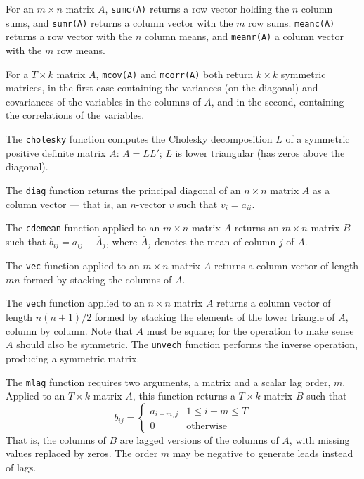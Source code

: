 For an $m \times n$ matrix $A$, \texttt{sumc(A)} returns a row vector
holding the $n$ column sums, and \texttt{sumr(A)} returns a column
vector with the $m$ row sums.  \texttt{meanc(A)} returns a row vector
with the $n$ column means, and \texttt{meanr(A)} a column vector with
the $m$ row means.

For a $T \times k$ matrix $A$, \texttt{mcov(A)} and \texttt{mcorr(A)}
both return $k \times k$ symmetric matrices, in the first case
containing the variances (on the diagonal) and covariances of the
variables in the columns of $A$, and in the second, containing the
correlations of the variables.

The \texttt{cholesky} function computes the Cholesky decomposition $L$
of a symmetric positive definite matrix $A$: $A = LL'$; $L$ is lower
triangular (has zeros above the diagonal).  

The \texttt{diag} function returns the principal diagonal of an
$n\times n$ matrix $A$ as a column vector --- that is, an
$n$-vector $v$ such that $v_i = a_{ii}$.

The \texttt{cdemean} function applied to an $m \times n$ matrix $A$
returns an $m \times n$ matrix $B$ such that $b_{ij} = a_{ij} -
\bar{A}_j$, where $\bar{A}_j$ denotes the mean of column $j$ of $A$.  

The \texttt{vec} function applied to an $m \times n$ matrix $A$
returns a column vector of length $mn$ formed by stacking the columns
of $A$.  

The \texttt{vech} function applied to an $n \times n$ matrix $A$
returns a column vector of length $n(n+1)/2$ formed by stacking the
elements of the lower triangle of $A$, column by column.  Note that
$A$ must be square; for the operation to make sense $A$ should also
be symmetric.  The \texttt{unvech} function performs the inverse
operation, producing a symmetric matrix.

The \texttt{mlag} function requires two arguments, a matrix and a
scalar lag order, $m$.  Applied to an $T \times k$ matrix $A$, this
function returns a $T \times k$ matrix $B$ such that
%
\[
  b_{ij} = \left\{ 
    \begin{array}{ll} 
      a_{i-m,j} & 1 \leq i - m \leq T \\ 
      0 & \mbox{otherwise}
    \end{array}
    \right.
\]
%
That is, the columns of $B$ are lagged versions of the columns of $A$,
with missing values replaced by zeros.  The order $m$ may be negative
to generate leads instead of lags.

